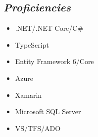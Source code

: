 \documentclass{res}
\begin{document}
{\begin{resume}
\section{\sl  Proficiencies}
\begin{itemize}[noitemsep]
  \item .NET/.NET Core/C\#
  \item TypeScript
  \item Entity Framework 6/Core
  \item Azure
  \item Xamarin
  \item Microsoft SQL Server
  \item VS/TFS/ADO
\end{itemize}

\end{resume}

\vfill}
\end{document}
